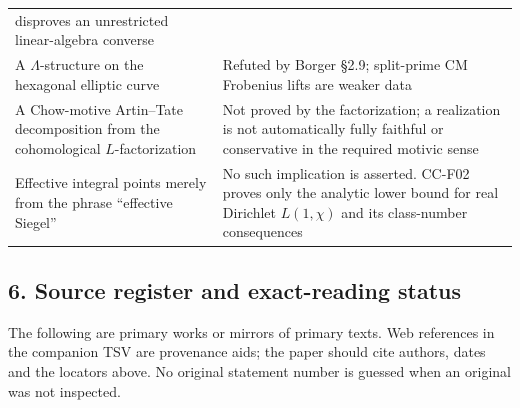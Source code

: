 \begin{longtable}[]{@{}
  >{\raggedright\arraybackslash}p{}
  >{\raggedright\arraybackslash}p{}@{}}
disproves an unrestricted linear-algebra converse \\
A \(\Lambda\)-structure on the hexagonal elliptic curve & Refuted by
Borger §2.9; split-prime CM Frobenius lifts are weaker data \\
A Chow-motive Artin--Tate decomposition from the cohomological
\(L\)-factorization & Not proved by the factorization; a realization is
not automatically fully faithful or conservative in the required motivic
sense \\
Effective integral points merely from the phrase ``effective Siegel'' &
No such implication is asserted. CC-F02 proves only the analytic lower
bound for real Dirichlet \(L(1,\chi)\) and its class-number
consequences \\
\end{longtable}

\subsection{6. Source register and exact-reading
status}\label{source-register-and-exact-reading-status}

The following are primary works or mirrors of primary texts. Web
references in the companion TSV are provenance aids; the paper should
cite authors, dates and the locators above. No original statement number
is guessed when an original was not inspected.

